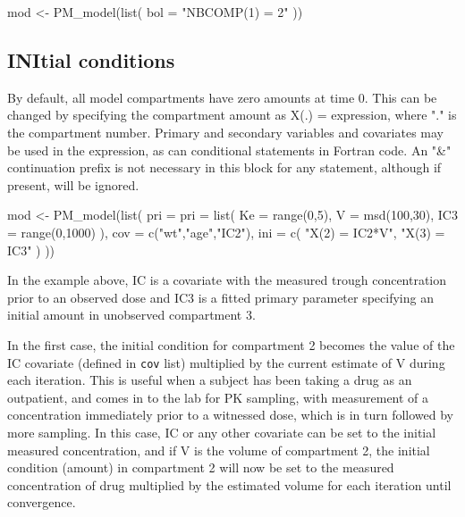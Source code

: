 \documentclass[
]{book}
\newenvironment{Shaded}{\begin{snugshade}}{\end{snugshade}}
\newcommand{\AttributeTok}[1]{\textcolor[rgb]{0.77,0.63,0.00}{#1}}
\newcommand{\DecValTok}[1]{\textcolor[rgb]{0.00,0.00,0.81}{#1}}
\newcommand{\FunctionTok}[1]{\textcolor[rgb]{0.00,0.00,0.00}{#1}}
\newcommand{\NormalTok}[1]{#1}
\newcommand{\OtherTok}[1]{\textcolor[rgb]{0.56,0.35,0.01}{#1}}
\newcommand{\StringTok}[1]{\textcolor[rgb]{0.31,0.60,0.02}{#1}}
\begin{document}
\begin{Shaded}
\begin{Highlighting}[]
\NormalTok{mod }\OtherTok{\textless{}{-}} \FunctionTok{PM\_model}\NormalTok{(}\FunctionTok{list}\NormalTok{(}
  \AttributeTok{bol =} \StringTok{"NBCOMP(1) = 2"}
\NormalTok{))}
\end{Highlighting}
\end{Shaded}

\hypertarget{iniR6}{%
\subsection{INItial conditions}\label{iniR6}}

By default, all model compartments have zero amounts at time 0. This can be changed by specifying the compartment amount as X(.) = expression, where "." is the compartment number. Primary and secondary variables and covariates may be used in the expression, as can conditional statements in Fortran code. An "\&" continuation prefix is not necessary in this block for any statement, although if present, will be ignored.

\begin{Shaded}
\begin{Highlighting}[]
\NormalTok{mod }\OtherTok{\textless{}{-}} \FunctionTok{PM\_model}\NormalTok{(}\FunctionTok{list}\NormalTok{(}
  \AttributeTok{pri =} \AttributeTok{pri =} \FunctionTok{list}\NormalTok{(}
    \AttributeTok{Ke =} \FunctionTok{range}\NormalTok{(}\DecValTok{0}\NormalTok{,}\DecValTok{5}\NormalTok{),}
    \AttributeTok{V =} \FunctionTok{msd}\NormalTok{(}\DecValTok{100}\NormalTok{,}\DecValTok{30}\NormalTok{),}
    \AttributeTok{IC3 =} \FunctionTok{range}\NormalTok{(}\DecValTok{0}\NormalTok{,}\DecValTok{1000}\NormalTok{)}
\NormalTok{  ),}
  \AttributeTok{cov =} \FunctionTok{c}\NormalTok{(}\StringTok{"wt"}\NormalTok{,}\StringTok{"age"}\NormalTok{,}\StringTok{"IC2"}\NormalTok{),}
  \AttributeTok{ini =} \FunctionTok{c}\NormalTok{(}
    \StringTok{"X(2) = IC2*V"}\NormalTok{,}
    \StringTok{"X(3) = IC3"}
\NormalTok{  )}
\NormalTok{))}
\end{Highlighting}
\end{Shaded}

In the example above, IC is a covariate with the measured trough
concentration prior to an observed dose and IC3 is a fitted primary parameter specifying an initial amount in unobserved compartment 3.

In the first case, the initial condition for compartment 2 becomes the
value of the IC covariate (defined in \texttt{cov} list) multiplied by
the current estimate of V during each iteration. This is useful when a
subject has been taking a drug as an outpatient, and comes in to the lab for PK sampling, with measurement of a concentration immediately prior to a witnessed dose, which is in turn followed by more sampling. In this case, IC or any other covariate can be set to the initial measured concentration, and if V is the volume of compartment 2, the initial condition (amount) in compartment 2 will now be set to the measured concentration of drug multiplied by the estimated volume for each iteration until convergence.
\end{document}
